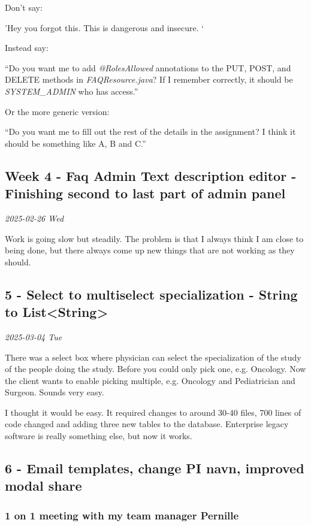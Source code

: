 \documentclass[../main.tex]{subfiles}
\begin{document}
Don't say:

'Hey you forgot this. This is dangerous and insecure. `

Instead say:

``Do you want me to add \emph{@RolesAllowed} annotations to the PUT, POST, and DELETE methods in \emph{FAQResource.java}? If I remember correctly, it should be \emph{SYSTEM\_ADMIN} who has access.''

Or the more generic version:

``Do you want me to fill out the rest of the details in the assignment? I think it should be something like A, B and C.''

\subsection{Week 4 - Faq Admin Text description editor - Finishing second to last part of admin panel}

\textit{2025-02-26 Wed}

Work is going slow but steadily. The problem is that I always think I am
close to being done, but there always come up new things that are not
working as they should. 

\subsection{5 - Select to multiselect specialization - String to List\textless String\textgreater{}}

\textit{2025-03-04 Tue}

There was a select box where physician can select the specialization of the study of the people doing the study. Before you could only pick one, e.g. Oncology. Now the client wants to enable picking multiple, e.g. Oncology and Pediatrician and Surgeon. Sounds very easy.

I thought it would be easy. It required changes to around 30-40 files, 700 lines of code changed and adding three new tables to the database. Enterprise legacy software is really something else, but now it works. 

\subsection{6 - Email templates, change PI navn, improved modal share }

\subsubsection{1 on 1 meeting with my team manager Pernille}
\end{document}
